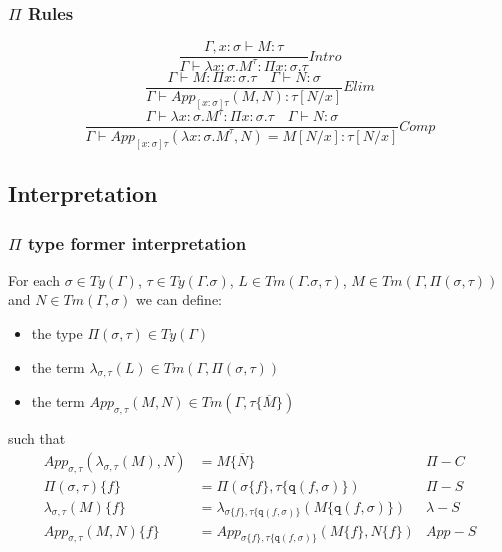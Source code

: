 \documentclass[aspectratio=169]{beamer}
\newcommand{\app}[2]{App_{[x:\sigma]\tau}(#1, #2)}
\newcommand{\C}{Comp}
\newcommand{\Intro}{Intro}
\newcommand{\E}{Elim}
\newcommand{\qq}{\texttt{q}}
\newcommand{\extension}{\Gamma.\sigma}
\newcommand{\Mbar}{\overline{M}}
\begin{document}
    \begin{frame}
        \frametitle{$\Pi$ Rules}
        $$\frac{\Gamma, x:\sigma \vdash M : \tau}{\Gamma \vdash \lambda x:\sigma.M^\tau : \Pi x:\sigma.\tau}\Intro$$
        \vspace{20pt}
        $$\frac{\Gamma \vdash M : \Pi x: \sigma . \tau \quad \Gamma \vdash N: \sigma}{\Gamma \vdash \app{M}{N}: \tau[N/x]}\E$$
        \vspace{20pt}
        $$\frac{\Gamma \vdash \lambda x:\sigma.M^\tau:\Pi x:\sigma.\tau \quad \Gamma \vdash N:\sigma}{\Gamma \vdash \app{\lambda x:\sigma.M^{\tau}}{N} = M[N/x]:\tau[N/x]}\C$$
    \end{frame}

    \subsection{Interpretation}
    \begin{frame}
        \frametitle{$\Pi$ type former interpretation}
        For each $\sigma\in Ty(\Gamma)$, $\tau\in Ty(\extension)$, $L\in Tm(\extension,\tau)$, $M\in Tm(\Gamma,\Pi(\sigma,\tau))$ and $N\in Tm(\Gamma,\sigma)$ we can define:
        \begin{itemize}
            \item the type $\Pi(\sigma,\tau)\in Ty(\Gamma)$
            \item the term $\lambda_{\sigma,\tau}(L)\in Tm(\Gamma,\Pi(\sigma,\tau))$
            \item the term $App_{\sigma,\tau}(M,N)\in Tm(\Gamma,\tau\{\Mbar\})$
        \end{itemize}
        such that
        \begin{align*}
            App_{\sigma,\tau}(\lambda_{\sigma,\tau}(M),N) &= M\{\overline{N}\} &\Pi-C\\
            \Pi(\sigma,\tau)\{f\} &= \Pi(\sigma\{f\},\tau\{\qq(f, \sigma)\}) &\Pi-S\\
            \lambda_{\sigma,\tau}(M)\{f\} &= \lambda_{\sigma\{f\},\tau\{\qq(f, \sigma)\}}(M\{\qq(f,\sigma)\}) &\lambda-S\\
            App_{\sigma,\tau}(M,N)\{f\} &= App_{\sigma\{f\},\tau\{\qq(f, \sigma)\}}(M\{f\},N\{f\}) &App-S
        \end{align*}
    \end{frame}
\end{document}
